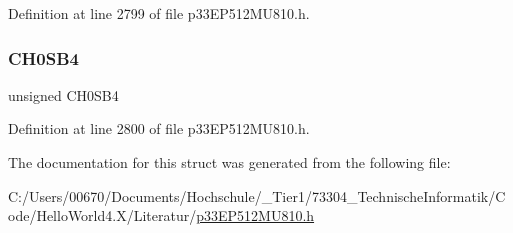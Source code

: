 Definition at line 2799 of file p33\+E\+P512\+M\+U810.\+h.

\mbox{\label{structtag_a_d2_c_h_s0_b_i_t_s_a4f65ab47f0d8e69cd9826d4a74fb614b}} 
\subsubsection{\texorpdfstring{C\+H0\+S\+B4}{CH0SB4}}
{\footnotesize\ttfamily unsigned C\+H0\+S\+B4}



Definition at line 2800 of file p33\+E\+P512\+M\+U810.\+h.



The documentation for this struct was generated from the following file\+:\begin{DoxyCompactItemize}
\item 
C\+:/\+Users/00670/\+Documents/\+Hochschule/\+\_\+\+Tier1/73304\+\_\+\+Technische\+Informatik/\+Code/\+Hello\+World4.\+X/\+Literatur/\hyperlink{p33_e_p512_m_u810_8h}{p33\+E\+P512\+M\+U810.\+h}\end{DoxyCompactItemize}
